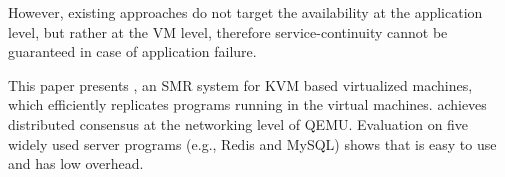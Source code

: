 
However, existing approaches do not target the availability at the application 
level, but rather at the VM level, therefore service-continuity cannot be 
guaranteed in case of application failure.

This paper presents \xxx, an SMR system for KVM based virtualized machines, 
which efficiently replicates programs running in the virtual machines. 
\xxx achieves distributed consensus at the networking level of QEMU. 
Evaluation on five widely used server programs (e.g., Redis and MySQL) shows 
that \xxx is easy to use and has low overhead.
